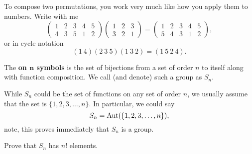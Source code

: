 \documentclass{ximera}
\begin{document}
\begin{example}
  To compose two permutations, you work very much like how you apply them to numbers.
  Write with me
  \[
  \left(\begin{smallmatrix}
    1 & 2 & 3 & 4 & 5\\
    4 & 3 & 5 & 1 & 2
  \end{smallmatrix}\right)
  \left(\begin{smallmatrix}
    1 & 2 & 3\\
    3 & 2 & 1
  \end{smallmatrix}\right)
  = \left(\begin{smallmatrix}
    1 & 2 & 3 & 4 & 5\\
    5 & 4 & 3 & 1 & 2
  \end{smallmatrix}\right),
  \]
  or in cycle notation
  \[
  (1\ 4)(2\ 3\ 5)(1\ 3\ 2) = (1\ 5\ 2\ 4).
  \]
\end{example}




\begin{definition}
  The  \textbf{on $\boldsymbol{n}$ symbols} is
  the set of bijections from a set of order $n$ to itself along with
  function composition. We call (and denote) such a group as $S_n$.
\end{definition}

\begin{remark}
  While $S_n$ could be the set of functions on any set of order $n$,
  we usually assume that the set is $\{1,2,3,\dots,n\}$. In
  particular, we could say
  \[
  S_n = \operatorname{Aut}(\{1,2,3,\dots,n\}),
  \]
  note, this proves immediately that $S_n$ is a group.
\end{remark}

\begin{exercise}
  Prove that $S_n$ has $n!$ elements.
\end{exercise}
\end{document}
